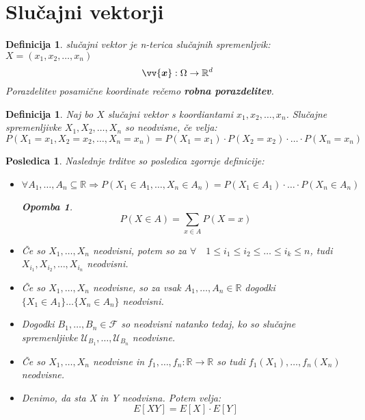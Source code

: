 \documentclass[11pt]{article}
\newtheorem{Posledica}[Izrek]{{\sc Posledica}}
\newtheorem{Definicija}[Izrek]{{\sc Definicija}}
\newtheorem{Opomba}[Izrek]{{\sc Opomba}}
\begin{document}
	\section{Slučajni vektorji}
	\begin{Definicija}
		slučajni vektor je n-terica slučajnih spremenljvik: $X = (x_1, x_2,\dots , x_n)$
		$$ \vv{\bm{x}}: \Omega \to \mathbb{R}^d$$
		Porazdelitev posamične koordinate rečemo \textbf{robna porazdelitev}.
	\end{Definicija}
	\begin{Definicija}
		Naj bo $X$ slučajni vektor s koordiantami $x_1,x_2,\dots, x_n$. Slučajne spremenljivke $X_1,X_2, \dots , X_n$ so neodvisne, če velja:
		$$P(X_1 = x_1, X_2 = x_2,\dotsc, X_n = x_n) = P(X_1 = x_1) \cdot P(X_2 = x_2) \cdot \dotsc \cdot P(X_n = x_n)$$
	\end{Definicija}
	\begin{Posledica}
		Naslednje trditve so posledica zgornje definicije:
		\begin{itemize}
			\item
			$\forall A_1,\dotsc, A_n \subseteq \mathbb{R} \Rightarrow P(X_1 \in A_1, \dotsc, X_n\in A_n) = P(X_1 \in A_1) \cdot \dotsc \cdot P(X_n \in A_n)$
			\begin{Opomba}
				$$P(X\in A ) = \sum_{x\in A}{P(X = x)}$$
			\end{Opomba}
			\item
			Če so $X_1, \dotsc ,X_n$ neodvisni, potem so za $\forall \quad 1\le i_1 \le i_2 \le \dotsc \le i_k\le n$, tudi $X_{i_1}, X_{i_2},\dotsc, X_{i_n}$ neodvisni.
			\item
			Če so $X_1, \dotsc ,X_n$ neodvisne, so za vsak $ A_1,\dotsc, A_n \in \mathbb{R}$ dogodki
			\\
			$\{X_1\in A_1\}\dotsc \{X_n\in A_n \}$ neodvisni.
			\item
			Dogodki $B_1, \dotsc, B_n \in \mathcal{F}$ so neodvisni natanko tedaj, ko so slučajne spremenljivke $ \mathcal{U}_{B_1},\dotsc, \mathcal{U}_{B_n}$ neodvisne.
			\item
			Če so $X_1, \dotsc, X_n$ neodvisne in $f_1,\dotsc,f_n : \mathbb{R} \to \mathbb{R}$ so tudi $f_1(X_1),\dotsc, f_n(X_n)$ neodvisne.
			\item
			Denimo, da sta X in Y neodvisna. Potem velja:
			$$E[XY] = E[X] \cdot E[Y]$$
		\end{itemize}
	\end{Posledica}
\end{document}
